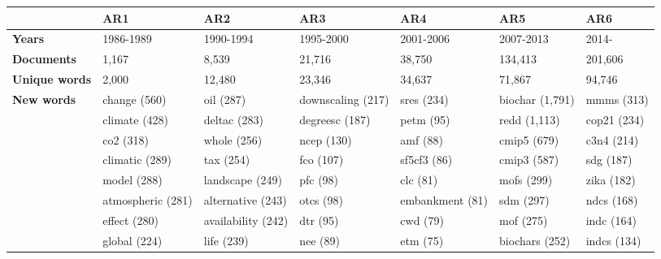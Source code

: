 \begin{tabular}{|l |p{1.8cm} p{1.8cm} p{1.8cm} p{1.8cm} p{1.8cm} p{1.8cm}|} 
\hline 
&\textbf{AR1} & \textbf{AR2} & \textbf{AR3} & \textbf{AR4} & \textbf{AR5} & \textbf{AR6}\\ \hline\textbf{Years} &1986-1989 & 1990-1994 & 1995-2000 & 2001-2006 & 2007-2013 & 2014-\\ 
\textbf{Documents} &1,167 & 8,539 & 21,716 & 38,750 & 134,413 & 201,606\\ 
\textbf{Unique words} &2,000 & 12,480 & 23,346 & 34,637 & 71,867 & 94,746\\ 
\textbf{New words} & change (560) & oil (287) & downscaling (217) & sres (234) & biochar (1,791) & mmms (313)\\ & climate (428) & deltac (283) & degreesc (187) & petm (95) & redd (1,113) & cop21 (234)\\ & co2 (318) & whole (256) & ncep (130) & amf (88) & cmip5 (679) & c3n4 (214)\\ & climatic (289) & tax (254) & fco (107) & sf5cf3 (86) & cmip3 (587) & sdg (187)\\ & model (288) & landscape (249) & pfc (98) & clc (81) & mofs (299) & zika (182)\\ & atmospheric (281) & alternative (243) & otcs (98) & embankment (81) & sdm (297) & ndcs (168)\\ & effect (280) & availability (242) & dtr (95) & cwd (79) & mof (275) & indc (164)\\ & global (224) & life (239) & nee (89) & etm (75) & biochars (252) & indcs (134) \\ \hline
\end{tabular}
